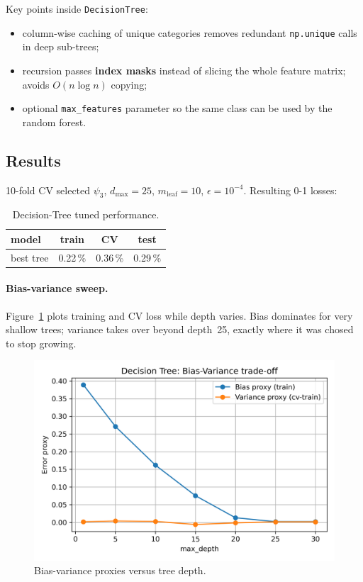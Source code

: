\documentclass[12pt]{report}
\begin{document}
Key points inside \texttt{DecisionTree}:

\begin{itemize}
  \item column-wise caching of unique categories removes redundant
        \texttt{np.unique} calls in deep sub-trees;
  \item recursion passes \textbf{index masks} instead of slicing the whole
        feature matrix; avoids $O(n\log n)$ copying;
  \item optional \texttt{max\_features} parameter so the same class can be used
        by the random forest.
\end{itemize}

\subsection{Results}
10-fold CV selected $\psi_3$, $d_{\max}=25$, $m_{\text{leaf}}=10$,
$\epsilon=10^{-4}$.  Resulting 0-1 losses:

\begin{table}[ht]
  \centering
  \caption{Decision-Tree tuned performance.}
  \label{tab:tree-res}
  \begin{tabular}{lccc}
    \toprule
    model & train & CV & test \\ \midrule
    best tree & 0.22\,\% & 0.36\,\% & 0.29\,\% \\
    \bottomrule
  \end{tabular}
\end{table}

\paragraph{Bias-variance sweep.}
Figure~\ref{fig:tree-bv} plots training and CV loss while depth varies. Bias
dominates for very shallow trees; variance takes over beyond depth~25, exactly
where it was chosed to stop growing.

\begin{figure}[ht]
  \centering
  \includegraphics[width=.65\linewidth]{../plots/tree_sweep_bias_variance_approx.png}
  \caption{Bias-variance proxies versus tree depth.}
  \label{fig:tree-bv}
\end{figure}
\end{document}
